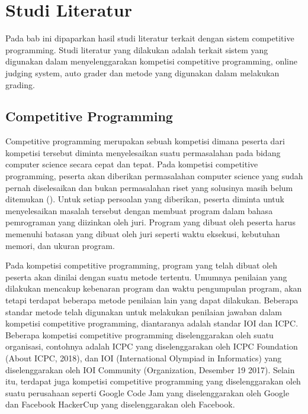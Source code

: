 \chapter{Studi Literatur}

\par Pada bab ini dipaparkan hasil studi literatur terkait dengan sistem competitive programming. Studi literatur yang dilakukan adalah terkait sistem yang digunakan dalam menyelenggarakan kompetisi competitive programming, online judging system, auto grader dan metode yang digunakan dalam melakukan grading.

\section{Competitive Programming}

\par Competitive programming merupakan sebuah kompetisi dimana peserta dari kompetisi tersebut diminta menyelesaikan suatu permasalahan pada bidang computer science secara cepat dan tepat. Pada kompetisi competitive programming, peserta akan diberikan permasalahan computer science yang sudah pernah diselesaikan dan bukan permasalahan riset yang solusinya masih belum ditemukan (\cite{halimsfcp3}). Untuk setiap persoalan yang diberikan, peserta diminta untuk menyelesaikan masalah tersebut dengan membuat program dalam bahasa pemrograman yang diizinkan oleh juri. Program yang dibuat oleh peserta harus memenuhi batasan yang dibuat oleh juri seperti waktu eksekusi, kebutuhan memori, dan ukuran program.
\par Pada kompetisi competitive programming, program yang telah dibuat oleh peserta akan dinilai dengan suatu metode tertentu. Umumnya penilaian yang dilakukan mencakup kebenaran program dan waktu pengumpulan program, akan tetapi terdapat beberapa metode penilaian lain yang dapat dilakukan. Beberapa standar metode telah digunakan untuk melakukan penilaian jawaban dalam kompetisi competitive programming, diantaranya adalah standar IOI dan ICPC. Beberapa kompetisi competitive programming diselenggarakan oleh suatu organisasi, contohnya adalah ICPC yang diselenggarakan oleh ICPC Foundation (About ICPC, 2018), dan IOI (International Olympiad in Informatics) yang diselenggarakan oleh IOI Community (Organization, Desember 19 2017). Selain itu, terdapat juga kompetisi competitive programming yang diselenggarakan oleh suatu perusahaan seperti Google Code Jam yang diselenggarakan oleh Google dan Facebook HackerCup yang diselenggarakan oleh Facebook.
